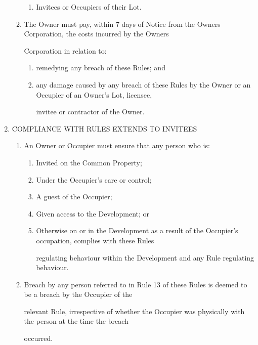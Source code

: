\documentclass{article}
\begin{document}
\begin{enumerate}[label=\arabic*.]
\begin{enumerate}[label=\arabic{enumi}.\arabic*.]
\begin{enumerate}[label=(\arabic*)]
\item  Invitees or Occupiers of their Lot. 

\end{enumerate}
\item  The Owner must pay, within 7 days of Notice from the Owners Corporation, the costs incurred by the Owners 

Corporation in relation to: 

\begin{enumerate}[label=(\arabic*)]
\item  remedying any breach of these Rules; and 

\item  any damage caused by any breach of these Rules by the Owner or an Occupier of an Owner’s Lot, licensee, 

invitee or contractor of the Owner. 

\end{enumerate}
\end{enumerate}
\item  COMPLIANCE WITH RULES EXTENDS TO INVITEES 

\begin{enumerate}[label=\arabic{enumi}.\arabic*.]
\item  An Owner or Occupier must ensure that any person who is: 

\begin{enumerate}[label=(\arabic*)]
\item  Invited on the Common Property; 

\item  Under the Occupier’s care or control; 

\item  A guest of the Occupier; 

\item  Given access to the Development; or 

\item  Otherwise on or in the Development as a result of the Occupier’s occupation, complies with these Rules 

regulating behaviour within the Development and any Rule regulating behaviour. 

\end{enumerate}
\item  Breach by any person referred to in Rule 13 of these Rules is deemed to be a breach by the Occupier of the 

relevant Rule, irrespective of whether the Occupier was physically with the person at the time the breach 

occurred. 

\end{enumerate}
\end{enumerate}
\end{document}
